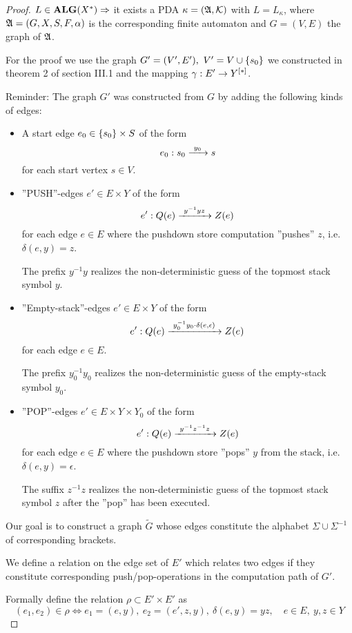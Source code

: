 \begin{proof}
$L\in \mbox{{\bf ALG}}(X^*) \Rightarrow$ it exists a PDA $\kappa=(\mbox{$\mathfrak{A}$},\mbox{$\mathcal{K}$})$ with
$L = L_\kappa$, where $\mbox{$\mathfrak{A}$}=(G, X, S, F, \alpha)$ is the corresponding finite
automaton and $G=(V, E)$ the graph of $\mbox{$\mathfrak{A}$}$.

For the proof we use the graph $G'=(V',E'),\ V' = V \cup \mbox{$\{s_0\}$}$ we
constructed in theorem 2 of section III.1 and the mapping $\gamma: E' \to \mbox{${Y}^{[*]}$}$.

Reminder: The graph $G'$ was constructed from $G$ by adding the following kinds
of edges:
\begin{itemize}
  \item A start edge $e_0 \in \mbox{$\{s_0\}$} \times S$ of the form 
  \[e_0: s_0 \xrightarrow{\ {y_0}\ } s\] 
  for each start vertex $s \in V$.
  
  \item ''PUSH''-edges $e' \in E \times Y$ of the form
  \[e': Q(e) \xrightarrow{\ {y^{-1} y z}\ } Z(e)\]
  for each edge $e \in E$ where the pushdown store computation ''pushes'' $z$,
  i.e.\ $\delta(e, y) = z$. 
  
  The prefix $y^{-1} y$ realizes the non-deterministic guess of the topmost
  stack symbol $y$.
  
  \item ''Empty-stack''-edges $e' \in E \times Y$ of the form
  \[e': Q(e) \xrightarrow{\ {y_0^{-1} y_0 \cdot \delta(e, \epsilon)}\ } Z(e)\]
  for each edge $e \in E$.
  
  The prefix $y_0^{-1} y_0$ realizes the non-deterministic guess of the
  empty-stack symbol $y_0$.
  
  \item ''POP''-edges $e' \in E \times Y \times Y_0$ of the form
  \[e': Q(e) \xrightarrow{\ {y^{-1} z^{-1} z}\ } Z(e)\]
  for each edge $e \in E$ where the pushdown store ''pops'' $y$ from the stack,
  i.e.\ $\delta(e, y) = \epsilon$.
  
  The suffix $z^{-1} z$ realizes the non-deterministic guess of the topmost
  stack symbol $z$ after the ''pop'' has been executed.
\end{itemize}

Our goal is to construct a graph $\tilde{G}$ whose edges constitute the alphabet
$\Sigma \cup \Sigma^{-1}$ of corresponding brackets.

We define a relation on the edge set of $E'$ which relates two edges if they
constitute corresponding push/pop-operations in the computation path of $G'$.

Formally define the relation $\rho \subset E' \times E'$ as
\[ (e_1, e_2) \in \rho \iff e_1 = (e, y),\ e_2 = (e', z, y),\ \delta(e, y) = y
z,\quad e \in E,\ y,z \in Y \]


\end{proof}
